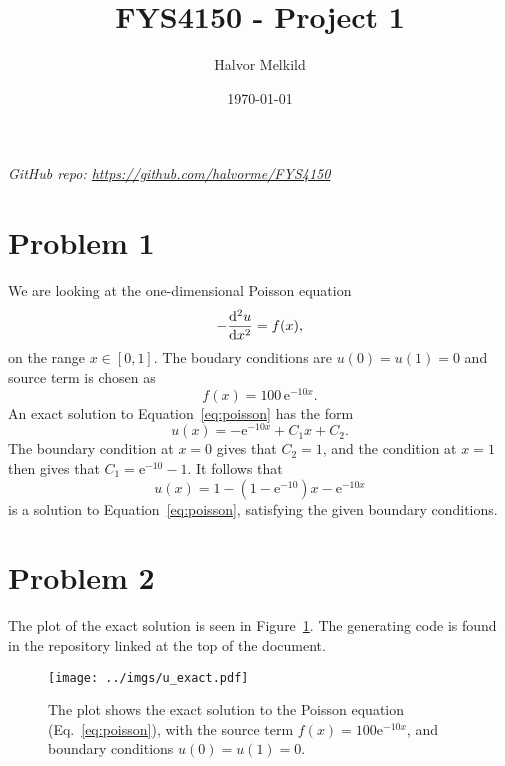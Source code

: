\documentclass[english,notitlepage,aps,pra,10pt]{revtex4-2}
\newcommand{\e}{\mathrm{e}}
\begin{document}
\title{FYS4150 - Project 1}      %
\author{Halvor Melkild}          %
\date{\today}                             %
\noaffiliation                            %


\maketitle

\textit{GitHub repo: \href{https://github.com/halvorme/FYS4150/}{https://github.com/halvorme/FYS4150}}

\section*{Problem 1}

We are looking at the one-dimensional Poisson equation 
\begin{equation}
    -\dv[2]{u}{x} = f(x),
    \label{eq:poisson}
\end{equation}
on the range $x \in [0,1]$. The boudary conditions are $u(0) = u(1) = 0$ and source term is chosen as 
\begin{equation}
    f(x) = 100\, \e^{-10x}.
\end{equation}
An exact solution to Equation~\ref{eq:poisson} has the form 
\begin{equation}
    u(x) = -\e^{-10x} + C_1 x + C_2.
\end{equation}
The boundary condition at $x=0$ gives that $C_2 = 1$, and the condition at $x=1$ then gives that $C_1 = \e^{-10} - 1$. It follows that 
\begin{equation}
    u(x) = 1 - (1-\e^{-10})x - \e^{-10x} 
\end{equation}
is a solution to Equation~\ref{eq:poisson}, satisfying the given boundary conditions.


\section*{Problem 2}

The plot of the exact solution is seen in Figure~\ref{fig:uExact}. The generating code is found in the repository linked at the top of the document.

\begin{figure}%
    \begin{center}
        \texttt{[image: ../imgs/u\_exact.pdf]} 
        \caption{The plot shows the exact solution to the Poisson equation (Eq.~\ref{eq:poisson}), with the source term $f(x) = 100 \e^{-10x}$, and boundary conditions $u(0)=u(1)=0$.}
        \label{fig:uExact}     
    \end{center}
\end{figure}
\end{document}
